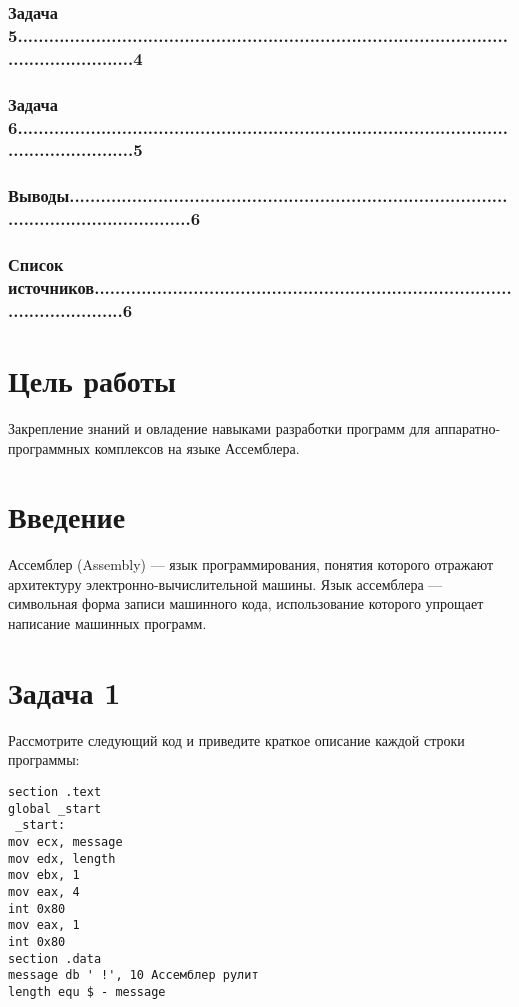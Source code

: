 \documentclass[12pt]{article}
\begin{document}
\subsubsection*{Задача 5......................................................................................................................4}
\subsubsection*{Задача 6......................................................................................................................5}
\subsubsection*{Выводы.......................................................................................................................6}
\subsubsection*{Список источников......................................................................................................6}
\newpage
\section*{Цель работы}
Закрепление знаний и овладение навыками разработки программ для
аппаратно-программных комплексов на языке Ассемблера.
\section*{Введение}
Ассемблер (Assembly) — язык программирования, понятия которого отражают
архитектуру электронно-вычислительной машины. Язык ассемблера — символьная форма
записи машинного кода, использование которого упрощает написание машинных программ.
\section*{Задача 1}
Рассмотрите следующий код и приведите краткое описание каждой строки
программы:
\begin{verbatim}
section .text
global _start
 _start:
mov ecx, message
mov edx, length
mov ebx, 1
mov eax, 4
int 0x80
mov eax, 1
int 0x80
section .data
message db ' !', 10 Ассемблер рулит
length equ $ - message
\end{verbatim}
\end{document}
